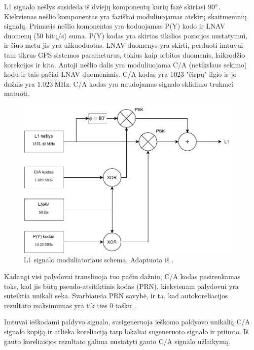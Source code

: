 \documentclass[main.tex]{subfiles}
\begin{document}
L1 signalo nešlys susideda iš dviejų komponentų kurių fazė skiriasi $90\degree$.
Kiekvienas nešlio komponentas yra faziškai moduliuojamas atskirų skaitmeninių signalų.
Primasis nešlio komonentas yra koduojamas P(Y) kodo ir LNAV duomenų (50 bitų/s) suma.
P(Y) kodas yra skirtas tikslios pozicijos nustatymui, ir šiuo metu jis yra užkuoduotas.
LNAV duomenys yra skirti, perduoti imtuvui tam tikrus GPS sistemos parameturus, tokius
kaip orbitos duomenis, laikrodžio korekcijos ir kita.
Antoji nešlio dalis yra moduliuojama C/A (netikslaus sekimo) kodu ir tais pačiai LNAV
duomenimis. C/A kodas yra 1023 "čirpų" ilgio ir jo dažnis yra $1.023\ \mathrm{MHz}$.
C/A kodas yra naudojamas signalo sklidimo trukmei matuoti.

\begin{figure}[h]
    \begin{centering}
    \includegraphics[scale=0.85]{drawings/l1_signal}
    \par\end{centering}
    \protect\caption{\label{fig:l1_signal}L1 signalo moduliatoriaus schema. Adaptuota iš \cite{Sadeghi2008TimeSS}.}
\end{figure}

Kadangi visi palydovai transliuoja tuo pačiu dažniu, C/A kodas pasirenkamas toks,
kad jis būtų pseudo-atsitiktinis kodas (PRN), kiekvienam palydovui yra suteiktia unikali seka.
Svarbiausia PRN savybė, ir ta, kad autokoreliacijos rezultato maksimumas yra tik
ties 0 tašku \cite{OCHIN202121_chapter2}.

Imtuvai ieškodami paldyvo signalo, susigeneruoja ieškomo paldyovo unikalią C/A signalo
kopiją ir atlieka koreliaciją tarp lokaliai sugeneruoto signalo ir priimto.
Iš gauto koreliaicjos rezultato galima nustatyti gauto C/A signalo užlaikymą.
\end{document}
